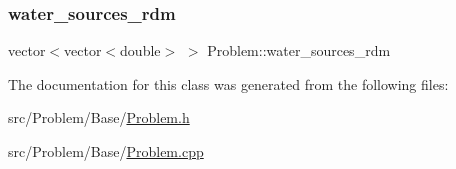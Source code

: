 \mbox{\label{classProblem_ace43e5306285f0d91a199a4bd5a38922_ace43e5306285f0d91a199a4bd5a38922}} 
\subsubsection{\texorpdfstring{water\+\_\+sources\+\_\+rdm}{water\_sources\_rdm}}
{\footnotesize\ttfamily vector$<$vector$<$double$>$ $>$ Problem\+::water\+\_\+sources\+\_\+rdm\hspace{0.3cm}{\ttfamily [protected]}}



The documentation for this class was generated from the following files\+:\begin{DoxyCompactItemize}
\item 
src/\+Problem/\+Base/\mbox{\hyperlink{Problem_8h}{Problem.\+h}}\item 
src/\+Problem/\+Base/\mbox{\hyperlink{Problem_8cpp}{Problem.\+cpp}}\end{DoxyCompactItemize}
